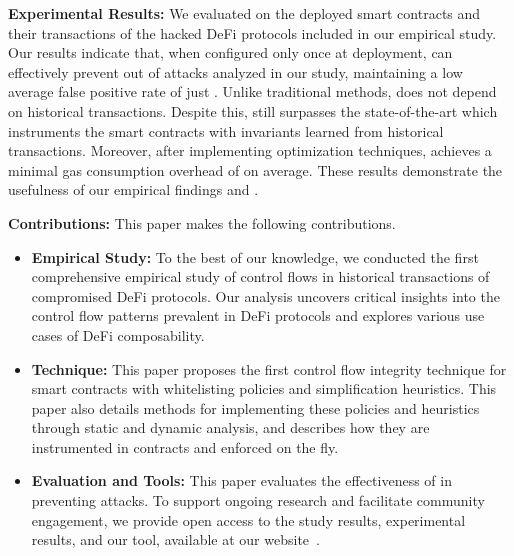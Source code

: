 
\noindent \textbf{Experimental Results:}
We evaluated {\name} on the deployed smart contracts and their transactions 
of the  hacked DeFi protocols
included in our empirical study. Our results indicate 
that, when 
configured only once at deployment, {\name} can effectively prevent 
 out of 
attacks analyzed in our study, maintaining a low average false positive rate of
just . Unlike traditional methods, {\name} does not depend on historical
transactions. Despite this, {\name} still surpasses the state-of-the-art which 
instruments the smart contracts with invariants learned from historical transactions.
Moreover, after implementing 
optimization techniques, {\name} achieves a minimal gas consumption overhead of
 on average. These results demonstrate the usefulness of our empirical
findings and {\name}. 

\noindent\textbf{Contributions:} This paper makes the following contributions. 
\begin{itemize}[leftmargin=*]
    \item \textbf{Empirical Study:} To the best of our knowledge, we conducted
        the first comprehensive empirical study of control flows in historical
        transactions of compromised DeFi protocols. Our analysis uncovers
        critical insights into the control flow patterns prevalent in DeFi protocols and
        explores various use cases of DeFi composability.

    \item \textbf{{\name} Technique:} This paper proposes the first control flow integrity
        technique for smart contracts with whitelisting policies and
        simplification heuristics. This paper also details methods for implementing 
        these policies and heuristics through static and dynamic analysis, and describes
        how they are instrumented in contracts and enforced on the fly. 

    \item \textbf{Evaluation and Tools:} This paper evaluates the effectiveness
        of {\name} in preventing attacks. To support ongoing research and
        facilitate community engagement, we provide open access to the
        study results, experimental results, and our tool,
        available at our website~\cite{website}.
\end{itemize}
\vspace{-2mm}


